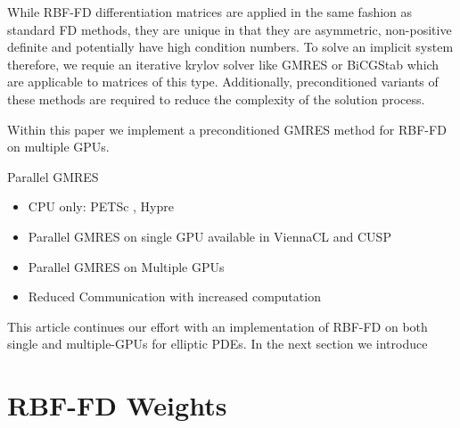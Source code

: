 While RBF-FD differentiation matrices are applied in the same fashion as standard FD methods, they are unique in that they are asymmetric, non-positive definite and potentially have high condition numbers. To solve an implicit system therefore, we requie an iterative krylov solver like GMRES or BiCGStab which are applicable to matrices of this type. Additionally, preconditioned variants of these methods are required to reduce the complexity of the solution process. 

Within this paper we implement a preconditioned GMRES method for RBF-FD on multiple GPUs. 

Parallel GMRES
\begin{itemize} 
	\item CPU only: PETSc \cite{Yokota2010}, Hypre \cite{Wildemann2009} 
	\item Parallel GMRES on single GPU available in ViennaCL \cite{Rupp2010} and CUSP \cite{Cusp2010}
	\item Parallel GMRES on Multiple GPUs \cite{Bahi2011}
	\item Reduced Communication with increased computation \cite{Dekker2000}
\end{itemize} 

This article continues our effort with an implementation of RBF-FD on both single and multiple-GPUs for elliptic PDEs. In the next section we introduce 





\section{RBF-FD Weights} 

